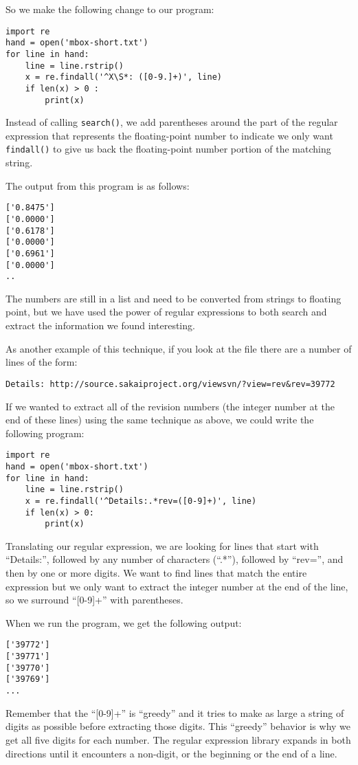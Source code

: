 So we make the following change to our program:

\beforeverb
\begin{verbatim}
import re
hand = open('mbox-short.txt')
for line in hand:
    line = line.rstrip()
    x = re.findall('^X\S*: ([0-9.]+)', line)
    if len(x) > 0 :
        print(x)
\end{verbatim}
\afterverb
%
Instead of calling {\tt search()}, we add parentheses around the part of the regular expression
that represents the floating-point number to indicate we only want {\tt findall()} to give us
back the floating-point number portion of the matching string.

The output from this program is as follows:

\beforeverb
\begin{verbatim}
['0.8475']
['0.0000']
['0.6178']
['0.0000']
['0.6961']
['0.0000']
..
\end{verbatim}
\afterverb
%
The numbers are still in a list and need to be converted from strings to floating point, but we
have used the power of regular expressions to both search and extract the information we found
interesting.

As another example of this technique, if you look at the file there are a number of lines
of the form:

\beforeverb
\begin{verbatim}
Details: http://source.sakaiproject.org/viewsvn/?view=rev&rev=39772
\end{verbatim}
\afterverb
%
If we wanted to extract all of the revision numbers (the integer number at the end of these lines)
using the same technique as above, we could write the following program:

\beforeverb
\begin{verbatim}
import re
hand = open('mbox-short.txt')
for line in hand:
    line = line.rstrip()
    x = re.findall('^Details:.*rev=([0-9]+)', line)
    if len(x) > 0:
        print(x)
\end{verbatim}
\afterverb
%
Translating our regular expression, we are looking for lines that start with ``Details:'',
followed by any number of characters (``.*''), followed by ``rev='', and then by one or
more digits.   We want to find lines that match the entire expression but we only want to
extract the integer number at the end of the line, so we surround ``[0-9]+'' with parentheses.  

When we run the program, we get the following output:

\beforeverb
\begin{verbatim}
['39772']
['39771']
['39770']
['39769']
...
\end{verbatim}
\afterverb
%
Remember that the ``[0-9]+'' is ``greedy'' and it tries to make as large a string of digits as
possible before extracting those digits.  This ``greedy'' behavior is why we get all five digits
for each number.  The regular expression library expands in both directions until it encounters a
non-digit, or the beginning or the end of a line.

